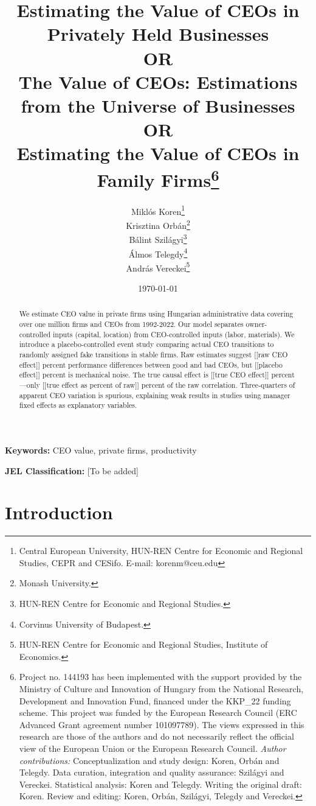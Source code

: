 \documentclass[11pt,a4paper]{article}
\title{Estimating the Value of CEOs in Privately Held Businesses \\ OR \\ The Value of CEOs: Estimations from the Universe of Businesses \\ OR \\ Estimating the Value of CEOs in Family Firms\thanks{Project no. 144193 has been implemented with the support provided by the Ministry of Culture and Innovation of Hungary from the National Research, Development and Innovation Fund, financed under the KKP\_22 funding scheme. This project was funded by the European Research Council (ERC Advanced Grant agreement number 101097789). The views expressed in this research are those of the authors and do not necessarily reflect the official view of the European Union or the European Research Council. \emph{Author contributions:} Conceptualization and study design: Koren, Orbán and Telegdy. Data curation, integration and quality assurance: Szilágyi and Vereckei. Statistical analysis: Koren and Telegdy. Writing the original draft: Koren. Review and editing: Koren, Orbán, Szilágyi, Telegdy and Vereckei.}}
\author{Miklós Koren\thanks{Central European University, HUN-REN Centre for Economic and Regional Studies, CEPR and CESifo. E-mail: korenm@ceu.edu} \\
        Krisztina Orbán\thanks{Monash University.} \\
        Bálint Szilágyi\thanks{HUN-REN Centre for Economic and Regional Studies.} \\
        Álmos Telegdy\thanks{Corvinus University of Budapest.} \\
        András Vereckei\thanks{HUN-REN Centre for Economic and Regional Studies, Institute of Economics.}}
\date{\today}
\begin{document}
\maketitle

\begin{abstract}
We estimate CEO value in private firms using Hungarian administrative data covering over one million firms and CEOs from 1992-2022. Our model separates owner-controlled inputs (capital, location) from CEO-controlled inputs (labor, materials). We introduce a placebo-controlled event study comparing actual CEO transitions to randomly assigned fake transitions in stable firms. Raw estimates suggest [[raw CEO effect]] percent performance differences between good and bad CEOs, but [[placebo effect]] percent is mechanical noise. The true causal effect is [[true CEO effect]] percent—only [[true effect as percent of raw]] percent of the raw correlation. Three-quarters of apparent CEO variation is spurious, explaining weak results in studies using manager fixed effects as explanatory variables.
\end{abstract}

\textbf{Keywords:} CEO value, private firms, productivity

\textbf{JEL Classification:} [To be added]

\newpage

\section{Introduction}

\end{document}
